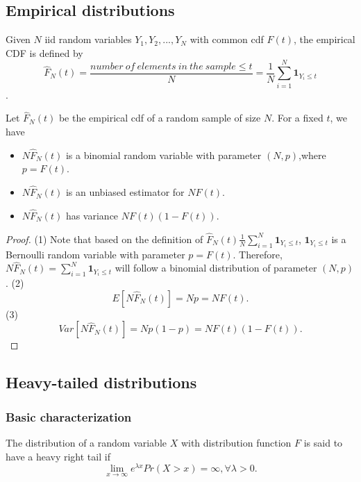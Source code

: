 \begin{refsection}
\subsection{Empirical distributions}


\begin{definition}
	Given $N$ iid random variables $Y_1,Y_2,...,Y_N$ with common cdf $F(t)$, the empirical CDF is defined by
	$$\hat{F}_N(t) = \frac{number~of~elements~in~the~sample \leq t}{N} = \frac{1}{N}\sum_{i=1}^N \bm{1}_{Y_i \leq t}$$.	
\end{definition}

\begin{lemma}
Let $\hat{F}_N(t)$ be the empirical cdf of a random sample of size $N$. For a fixed $t$, we have
\begin{itemize}
	\item $N\hat{F}_N(t)$ is a binomial random variable with parameter $(N,p)$,where $p = F(t)$.
	\item $N\hat{F}_N(t)$ is an unbiased estimator for $NF(t)$.
	\item $N\hat{F}_N(t)$ has variance $NF(t)(1 - F(t))$.
\end{itemize}	
\end{lemma}
\begin{proof}
(1) Note that based on the definition of $\hat{F}_N(t)	\frac{1}{N}\sum_{i=1}^N \bm{1}_{Y_i \leq t}$, $\bm{1}_{Y_i \leq t}$ is a Bernoulli random variable with parameter $p = F(t)$. Therefore,  $N\hat{F}_N(t) = \sum_{i=1}^N \bm{1}_{Y_i \leq t}$ will follow a binomial distribution of parameter $(N,p)$.
(2) $$E[N\hat{F}_N(t) ] = Np = NF(t).$$ 
(3) $$Var[N\hat{F}_N(t) ] = Np(1 - p) = NF(t)(1-F(t)).$$
\end{proof}

\subsection{Heavy-tailed distributions}
\subsubsection{Basic characterization}
\begin{definition}
The distribution of a random variable $X$ with distribution function $F$ is said to have a heavy right tail if
$$\lim_{x\to \infty} e^{\lambda x} Pr(X>x) = \infty, \forall \lambda > 0.$$
\end{definition}


\end{refsection}
